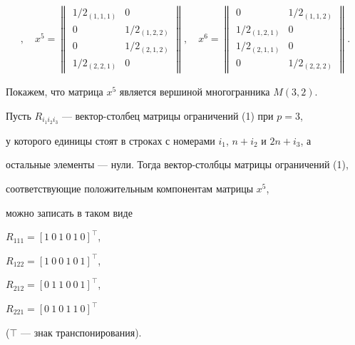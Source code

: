 \begin{gather*}
,\quad


x^5=


\begin{Vmatrix}


1/2_{(1,1,1)} & 0\\


0 & 1/2_{(1,2,2)}\\


0 & 1/2_{(2,1,2)}\\


1/2_{(2,2,1)} & 0


\end{Vmatrix},\quad


x^6=


\begin{Vmatrix}


0 & 1/2_{(1,1,2)}\\


1/2_{(1,2,1)} & 0\\


1/2_{(2,1,1)} & 0\\


0 & 1/2_{(2,2,2)}


\end{Vmatrix}.


\end{gather*}





Покажем, что матрица $x^5$ является вершиной многогранника $M(3,2)$.





Пусть $R_{i_1 i_2 i_3}$ --- вектор-столбец матрицы ограничений (1) при $p=3$,


у которого единицы стоят в строках с номерами $i_1$, $n+i_2$ и $2n+i_3$, а


остальные элементы --- нули. Тогда вектор-столбцы матрицы ограничений (1),


соответствующие положительным компонентам матрицы $x^5$,


можно записать в таком виде


$R_{111}=[1\ 0\ 1\ 0\ 1\ 0]^\top$,


$R_{122}=[1\ 0\ 0\ 1\ 0\ 1]^\top$,


$R_{212}=[0\ 1\ 1\ 0\ 0\ 1]^\top$,


$R_{221}=[0\ 1\ 0\ 1\ 1\ 0]^\top$


($\top$ --- знак транспонирования).





